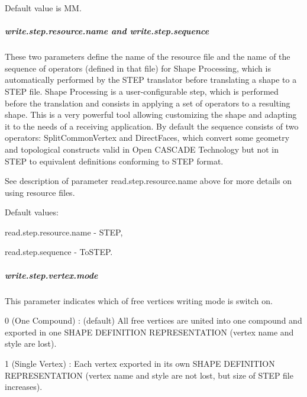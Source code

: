 Default value is MM.

\subparagraph*{write.\+step.\+resource.\+name and write.\+step.\+sequence}

These two parameters define the name of the resource file and the name of the sequence of operators (defined in that file) for Shape Processing, which is automatically performed by the S\+T\+EP translator before translating a shape to a S\+T\+EP file. Shape Processing is a user-\/configurable step, which is performed before the translation and consists in applying a set of operators to a resulting shape. This is a very powerful tool allowing customizing the shape and adapting it to the needs of a receiving application. By default the sequence consists of two operators\+: Split\+Common\+Vertex and Direct\+Faces, which convert some geometry and topological constructs valid in Open C\+A\+S\+C\+A\+DE Technology but not in S\+T\+EP to equivalent definitions conforming to S\+T\+EP format.

See description of parameter read.\+step.\+resource.\+name above for more details on using resource files.

Default values\+:
\begin{DoxyItemize}
\item read.\+step.\+resource.\+name -\/ S\+T\+EP,
\item read.\+step.\+sequence -\/ To\+S\+T\+EP.
\end{DoxyItemize}

\subparagraph*{write.\+step.\+vertex.\+mode}

This parameter indicates which of free vertices writing mode is switch on.
\begin{DoxyItemize}
\item 0 (One Compound) \+: (default) All free vertices are united into one compound and exported in one S\+H\+A\+PE D\+E\+F\+I\+N\+I\+T\+I\+ON R\+E\+P\+R\+E\+S\+E\+N\+T\+A\+T\+I\+ON (vertex name and style are lost).
\item 1 (Single Vertex) \+: Each vertex exported in its own S\+H\+A\+PE D\+E\+F\+I\+N\+I\+T\+I\+ON R\+E\+P\+R\+E\+S\+E\+N\+T\+A\+T\+I\+ON (vertex name and style are not lost, but size of S\+T\+EP file increases).
\end{DoxyItemize}

